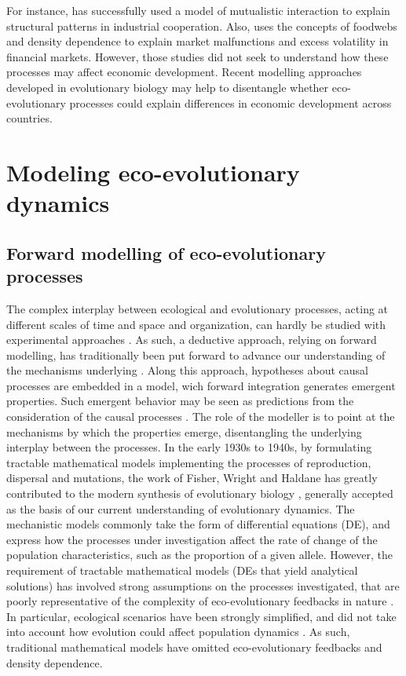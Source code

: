 % 
For instance, \citep{Saavedra2009a} has successfully used a model of mutualistic interaction to explain structural patterns in industrial cooperation.
% 
Also, \citep{Scholl2020} uses the concepts of foodwebs and density dependence to explain market malfunctions and excess volatility in financial markets.
% 
However, those studies did not seek to understand how these processes may affect economic development.
% 
Recent modelling approaches developed in evolutionary biology may help to disentangle whether eco-evolutionary processes could explain differences in economic development across countries.

\section{Modeling eco-evolutionary dynamics}

\subsection{Forward modelling of eco-evolutionary processes}
The complex interplay between ecological and evolutionary processes, acting at different scales of time and space and organization, can hardly be studied with experimental approaches \citep{Pontarp2019,Hagen2022}. 
As such, a deductive approach, relying on forward modelling, has traditionally been put forward to advance our understanding of the mechanisms underlying \citep{Brummitt2020}. Along this approach, hypotheses about causal processes are embedded in a model, wich forward integration generates emergent properties. Such emergent behavior may be seen as predictions from the consideration of the causal processes \citep{May2004}. The role of the modeller is to point at the mechanisms by which the properties emerge, disentangling the underlying interplay between the processes. %
% 
In the early 1930s to 1940s, by formulating tractable mathematical models implementing the processes of reproduction, dispersal and mutations, the work of Fisher, Wright and Haldane has greatly contributed to the modern synthesis of evolutionary biology \citep{huxley1942evolution}, generally accepted as the basis of our current understanding of evolutionary dynamics. 
% 
The mechanistic models commonly take the form of differential equations (DE), and express how the processes under investigation affect the rate of change of the population characteristics, such as the proportion of a given allele. 
% 
However, the requirement of tractable mathematical models (DEs that yield analytical solutions) has involved strong assumptions on the processes investigated, that are poorly representative of the complexity of eco-evolutionary feedbacks in nature \citep{Govaert2019a}. In particular, ecological scenarios have been strongly simplified, and did not take into account how evolution could affect population dynamics \citep{Lion2022}. As such, traditional mathematical models have omitted eco-evolutionary feedbacks and density dependence.

